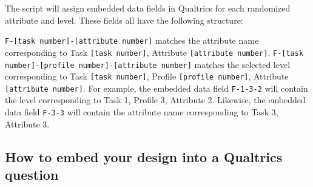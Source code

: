 \documentclass[12pt]{article}
\begin{document}
The script will assign embedded data fields in Qualtrics for each randomized attribute and level. These fields all have the following structure: 

\texttt{F-[task number]-[attribute number]} matches the attribute name corresponding to Task \texttt{[task number]}, Attribute \texttt{[attribute number]}. \texttt{F-[task number]-[profile number]-[attribute number]} matches the selected level corresponding to Task \texttt{[task number]}, Profile \texttt{[profile number]}, Attribute \texttt{[attribute number]}. For example, the embedded data field \texttt{F-1-3-2} will contain the level corresponding to Task 1, Profile 3, Attribute 2. Likewise, the embedded data field \texttt{F-3-3} will contain the attribute name corresponding to Task 3, Attribute 3.

\subsection{How to embed your design into a Qualtrics question}
\end{document}
